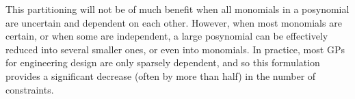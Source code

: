 This partitioning will not be of much benefit when all monomials in a posynomial are uncertain and dependent on each other. However, when most monomials are certain, or when some are independent, a large posynomial can be effectively reduced into several smaller ones, or even into monomials. In practice, most GPs for engineering design are only sparsely dependent, and so this formulation provides a significant decrease (often by more than half) in the number of constraints.